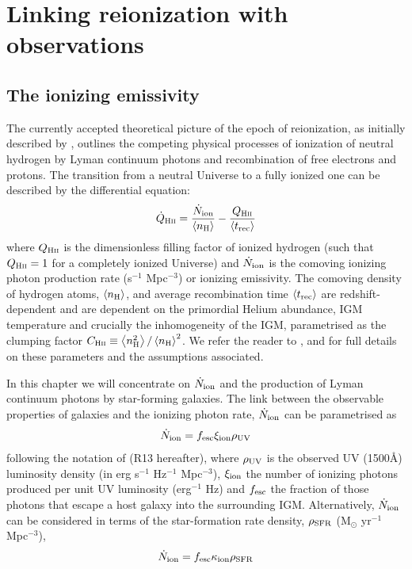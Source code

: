 \section{Linking reionization with observations}\label{reion-sec:link}
\subsection{The ionizing emissivity}
The currently accepted theoretical picture of the epoch of reionization, as initially described by \citet{Madau:1999kl}, outlines the competing physical processes of ionization of neutral hydrogen by Lyman continuum photons and recombination of free electrons and protons. The transition from a neutral Universe to a fully ionized one can be described by the differential equation:
\begin{equation}
\dot{Q}_\textsc{Hii} = \frac{\dot{N}_{\rm{ion}}}{\left \langle n_{\textsc{H}} \right \rangle} - \frac{{Q}_\textsc{Hii}}{\left \langle t_{\rm{rec}} \right \rangle}
\end{equation}
\noindent where ${Q}_\textsc{Hii}$ is the dimensionless filling factor of ionized hydrogen (such that ${Q}_\textsc{Hii} = 1$ for a completely ionized Universe) and $\dot{N}_{\rm{ion}}$ is the comoving ionizing photon production rate (s$^{-1}$ Mpc$^{-3}$) or ionizing emissivity. The comoving density of hydrogen atoms, $\left \langle n_{\textsc{H}} \right \rangle$, and average recombination time $\left \langle t_{\rm{rec}} \right \rangle$ are redshift-dependent and are dependent on the primordial Helium abundance, IGM temperature and crucially the inhomogeneity of the IGM, parametrised as the clumping factor $C_{\textsc{Hii}} \equiv \left \langle n^{2}_{\textsc{H}} \right \rangle / \left \langle n_{\textsc{H}} \right \rangle^{2}$\citep{Pawlik:2009id}. 
We refer the reader to \citet{Madau:1999kl}, \citet{Kuhlen:2012ka} and \citet{2010Natur.468...49R,Robertson:2013ji} for full details on these parameters and the assumptions associated. 

In this chapter we will concentrate on $\dot{N}_{\rm{ion}}$ and the production of Lyman continuum photons by star-forming galaxies. The link between the observable properties of galaxies and the ionizing photon rate, $\dot{N}_{\rm{ion}}$ can be parametrised as
\begin{equation}\label{eq:Nion_UV}
\dot{N}_{\rm{ion}} = f_{\rm{esc}}\xi_{\rm{ion}}\rho_{\rm{UV}}
\end{equation}
\noindent following the notation of \citet{Robertson:2013ji} (R13 hereafter), where $\rho_{\rm{UV}}$ is the observed UV (1500\AA) luminosity density (in erg s$^{-1}$ Hz$^{-1}$ Mpc$^{-3}$), $\xi_{\rm{ion}}$ the number of ionizing photons produced per unit UV luminosity (erg$^{-1}$ Hz) and $f_{\rm{esc}}$ the fraction of those photons that escape a host galaxy into the surrounding IGM. Alternatively, $\dot{N}_{\rm{ion}}$ can be considered in terms of the star-formation rate density, $\rho_{\rm{SFR}}$ (M$_{\odot}$ yr$^{-1}$ Mpc$^{-3}$),
\begin{equation}\label{eq:Nion_SFR}
    \dot{N}_{\rm{ion}} = f_{\rm{esc}} \kappa_{\rm{ion}} \rho_{\rm{SFR}}
\end{equation}

